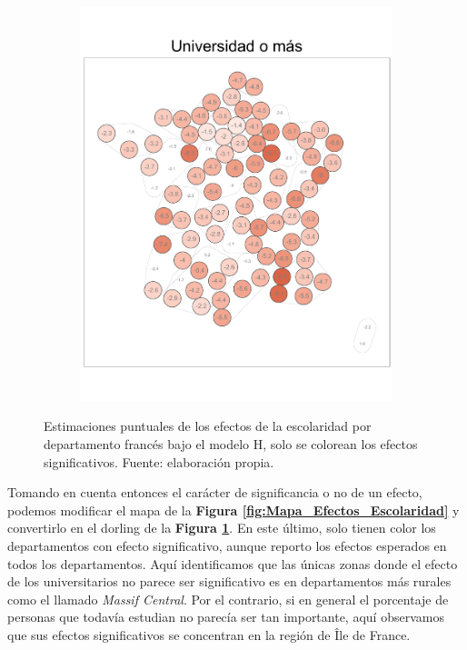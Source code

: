 \begin{figure}
\begin{subfigure}{0.275\textwidth}
	\includegraphics[width = \textwidth]{Figs/Efectos/Dorling_Efectos_Dip4_Modelo_H}
	\end{subfigure}
	\caption{Estimaciones puntuales de los efectos de la escolaridad por departamento francés bajo el modelo H, solo se colorean los efectos significativos. Fuente: elaboración propia.}
	\label{fig:Dorling_Efectos_Escolaridad}
\end{figure}

Tomando en cuenta entonces el carácter de significancia o no de un efecto, podemos modificar el mapa de la \textbf{Figura \ref{fig:Mapa_Efectos_Escolaridad}} y convertirlo en el dorling de la \textbf{Figura \ref{fig:Dorling_Efectos_Escolaridad}}. En este último, solo tienen color los departamentos con efecto significativo, aunque reporto los efectos esperados en todos los departamentos. Aquí identificamos que las únicas zonas donde el efecto de los universitarios no parece ser significativo es en departamentos más rurales como el llamado \textit{Massif Central}. Por el contrario, si en general el porcentaje de personas que todavía estudian no parecía ser tan importante, aquí observamos que sus efectos significativos se concentran en la región de Île de France. 

